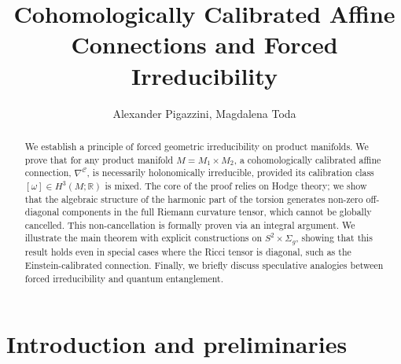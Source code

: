 \documentclass[12pt]{article}
\title{Cohomologically Calibrated Affine Connections and Forced Irreducibility}
\author{Alexander Pigazzini, Magdalena Toda}
\date{}
\begin{document}
\maketitle

\begin{abstract}
We establish a principle of forced geometric irreducibility on product manifolds. We prove that for any product manifold $M=M_1\times M_2$, a cohomologically calibrated affine connection, $\nabla^{\mathcal{C}}$, is necessarily holonomically irreducible, provided its calibration class $[\omega] \in H^3(M;\mathbb{R})$ is mixed. The core of the proof relies on Hodge theory; we show that the algebraic structure of the harmonic part of the torsion generates non-zero off-diagonal components in the full Riemann curvature tensor, which cannot be globally cancelled. This non-cancellation is formally proven via an integral argument. We illustrate the main theorem with explicit constructions on $S^2\times \Sigma_g$, showing that this result holds even in special cases where the Ricci tensor is diagonal, such as the Einstein-calibrated connection. Finally, we briefly discuss speculative analogies between forced irreducibility and quantum entanglement.
\end{abstract}


\section{Introduction and preliminaries}
\end{document}
